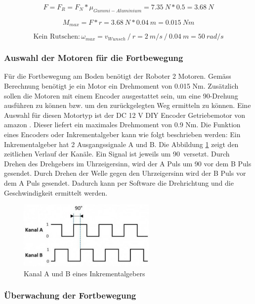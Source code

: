 \[F = F_R = F_N * {\mu_{Gummi-Aluminium}} = 7.35\ N * 0.5 = 3.68\ N\]

\[M_{max} = F * r = 3.68\ N * 0.04\ m = 0.015\ Nm\]

\[\text{Kein Rutschen}: \omega_{max} = v_{Wunsch}\ /\ r = 2\ m/s\ /\ 0.04\ m = 50\ rad/s\]


\subsubsection{Auswahl der Motoren für die Fortbewegung}
Für die Fortbewegung am Boden benötigt der Roboter 2 Motoren. Gemäss Berechnung benötigt je ein Motor ein Drehmoment von 0.015 Nm. Zusätzlich sollen die Motoren mit einem Encoder ausgestattet sein, um eine 90\textdegree-Drehung ausführen zu können bzw. um den zurückgelegten Weg ermitteln zu können. Eine Auswahl für diesen Motortyp ist der DC 12 V DIY Encoder Getriebemotor von amazon \cite{MotorEncoder}. Dieser liefert ein maximales Drehmoment von 0.9 Nm. 
Die Funktion eines Encoders oder Inkrementalgeber kann wie folgt beschrieben werden: Ein Inkrementalgeber hat 2 Ausgangssignale \glqq A\grqq{} und \glqq B\grqq{}. Die Abbildung \ref{fig4} zeigt den zeitlichen Verlauf der Kanäle. Ein Signal ist jeweils um 90\textdegree\ versetzt. Durch Drehen des Drehgebers im Uhrzeigersinn, wird der \glqq A\grqq{} Puls um 90\textdegree{} vor dem \glqq B\grqq{} Puls gesendet. Durch Drehen der Welle gegen den Uhrzeigersinn wird der \glqq B\grqq{} Puls vor dem \glqq A\grqq{} Puls gesendet. Dadurch kann per Software die Drehrichtung und die Geschwindigkeit ermittelt werden.

\begin{figure}[H]
  \includegraphics[width=0.6\textwidth]{img/Fortbewegung/Increment Encoder Signal.png}
  \centering
  \caption{Kanal A und B eines Inkrementalgebers}
  \label{fig4}
\end{figure}


\subsubsection{Überwachung der Fortbewegung}

